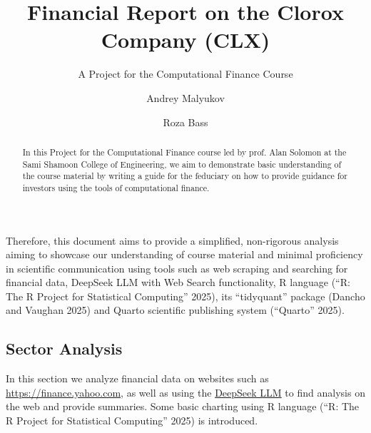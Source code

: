 \documentclass[
  letterpaper,
  DIV=11,
  numbers=noendperiod]{scrartcl}
\title{Financial Report on the Clorox Company (CLX)}
\subtitle{A Project for the Computational Finance Course}
\author{Andrey Malyukov \and Roza Bass}
\date{}
\renewcommand*\contentsname{Table of contents}
\newcommand\contentsname{Table of contents}
\begin{document}
\maketitle
\begin{abstract}
In this Project for the Computational Finance course led by prof. Alan
Solomon at the Sami Shamoon College of Engineering, we aim to
demonstrate basic understanding of the course material by writing a
guide for the feduciary on how to provide guidance for investors using
the tools of computational finance.
\end{abstract}

\renewcommand*\contentsname{Table of contents}
{
\hypersetup{linkcolor=}
\setcounter{tocdepth}{3}
\tableofcontents
}

\begin{tcolorbox}[enhanced jigsaw, leftrule=.75mm, titlerule=0mm, bottomtitle=1mm, toprule=.15mm, colframe=quarto-callout-warning-color-frame, rightrule=.15mm, breakable, left=2mm, opacityback=0, arc=.35mm, toptitle=1mm, colback=white, title=\textcolor{quarto-callout-warning-color}{\faExclamationTriangle}\hspace{0.5em}{On the simplified nature of analysis in this document.}, coltitle=black, bottomrule=.15mm, opacitybacktitle=0.6, colbacktitle=quarto-callout-warning-color!10!white]

Therefore, this document aims to provide a simplified, non-rigorous
analysis aiming to showcase our understanding of course material and
minimal proficiency in scientific communication using tools such as web
scraping and searching for financial data, DeepSeek LLM with Web Search
functionality, R language ({``R: {The R Project} for {Statistical
Computing}''} 2025), its ``tidyquant'' package (Dancho and Vaughan 2025)
and Quarto scientific publishing system ({``Quarto''} 2025).

\end{tcolorbox}

\subsection{Sector Analysis}\label{sector-analysis}

\begin{tcolorbox}[enhanced jigsaw, leftrule=.75mm, titlerule=0mm, bottomtitle=1mm, toprule=.15mm, colframe=quarto-callout-note-color-frame, rightrule=.15mm, breakable, left=2mm, opacityback=0, arc=.35mm, toptitle=1mm, colback=white, title=\textcolor{quarto-callout-note-color}{\faInfo}\hspace{0.5em}{Note}, coltitle=black, bottomrule=.15mm, opacitybacktitle=0.6, colbacktitle=quarto-callout-note-color!10!white]

In this section we analyze financial data on websites such as
\url{https://finance.yahoo.com}, as well as using the
\href{https://chat.deepseek.com/}{DeepSeek LLM} to find analysis on the
web and provide summaries. Some basic charting using R language ({``R:
{The R Project} for {Statistical Computing}''} 2025) is introduced.

\end{tcolorbox}
\end{document}

